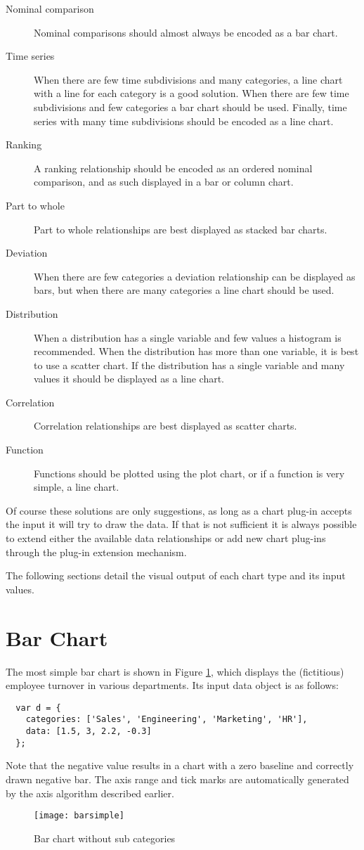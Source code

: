 \begin{description}
\item[Nominal comparison] Nominal comparisons should almost always be encoded as a bar chart.
\item[Time series] When there are few time subdivisions and many categories, a line chart with a line for each category is a good solution. When there are few time subdivisions and few categories a bar chart should be used. Finally,  time series with many time subdivisions should be encoded as a line chart.
\item[Ranking] A ranking relationship should be encoded as an ordered nominal comparison, and as such displayed in a bar or column chart.
\item[Part to whole] Part to whole relationships are best displayed as stacked bar charts.
\item[Deviation] When there are few categories a deviation relationship can be displayed as bars, but when there are many categories a line chart should be used.
\item[Distribution] When a distribution has a single variable and few values a histogram is recommended. When the distribution has more than one variable, it is best to use a scatter chart. If the distribution has a single variable and many values it should be displayed as a line chart. 
\item[Correlation] Correlation relationships are best displayed as scatter charts.
\item[Function] Functions should be plotted using the plot chart, or if a function is very simple, a line chart.
\end{description}

Of course these solutions are only suggestions, as long as a chart plug-in accepts the input it will try to draw the data. If that is not sufficient it is always possible to extend either the available data relationships or add new chart plug-ins through the plug-in extension mechanism.

The following sections detail the visual output of each chart type and its input values.

\section{Bar Chart}
The most simple bar chart is shown in Figure \ref{barsimple}, which displays the (fictitious) employee turnover in various departments. Its input data object is as follows:
\begin{verbatim}
  var d = {
    categories: ['Sales', 'Engineering', 'Marketing', 'HR'],
    data: [1.5, 3, 2.2, -0.3]
  };
\end{verbatim}
Note that the negative value results in a chart with a zero baseline and correctly drawn negative bar. The axis range and tick marks are automatically generated by the axis algorithm described earlier.
\begin{figure}[H]
	\centering
	\texttt{[image: barsimple]}
	\caption{Bar chart without sub categories}
	\label{barsimple}
\end{figure}

